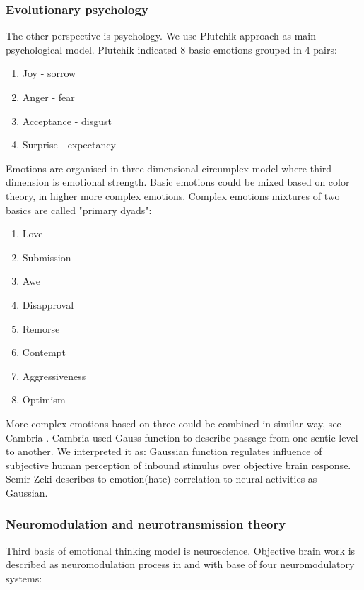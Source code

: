\subsubsection{Evolutionary psychology}

The other perspective is psychology.  We use Plutchik approach\cite{natureofemotions} as main psychological model. Plutchik indicated 8 basic emotions grouped in 4 pairs:

\begin{enumerate}
\item  Joy - sorrow
\item  Anger - fear
\item  Acceptance - disgust
\item  Surprise - expectancy
\end{enumerate}

Emotions are organised in three dimensional circumplex model where third dimension is emotional strength. Basic emotions could be mixed based on color theory, in higher more complex emotions. Complex emotions mixtures of two basics are called "primary dyads":

\begin{enumerate}
\item  Love
\item  Submission
\item  Awe
\item  Disapproval
\item  Remorse
\item  Contempt
\item  Aggressiveness
\item  Optimism
\end{enumerate}

More complex emotions based on three could be combined in similar way, see Cambria \cite{senticcomputing}.
Cambria \cite{hourglass} used Gauss function to describe passage from one sentic level to another. We interpreted it as: Gaussian function regulates influence of subjective human perception of inbound stimulus over objective brain response. Semir Zeki\cite{neuralcorrelatesofhate} describes to emotion(hate) correlation to neural activities as Gaussian.

\subsubsection{Neuromodulation and neurotransmission theory}

Third basis of emotional thinking model is neuroscience. Objective brain work is described as neuromodulation process in \cite{neuromodulatory} and \cite{emotionsbraintorobot} with base of four neuromodulatory systems:


